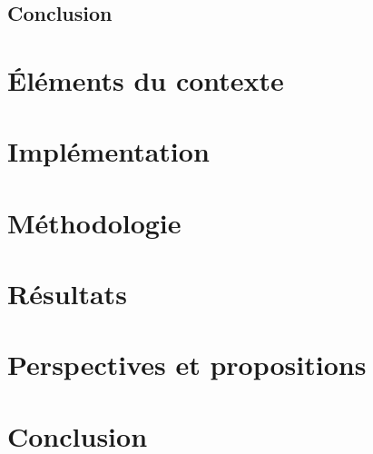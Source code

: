 \documentclass[11pt,a4paper,oneside]{report}
\begin{document}
	\section{Conclusion}
	

\chapter{Éléments du contexte}
	
	
\chapter{Implémentation}
		
	
\chapter{Méthodologie}
	
	
\chapter{Résultats}
		

\chapter{Perspectives et propositions}
	

\chapter*{Conclusion}	
	
	
	
\end{document}
